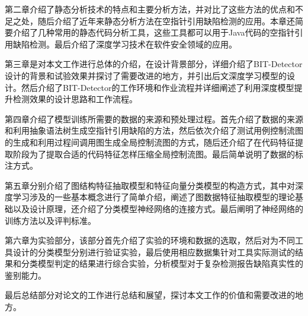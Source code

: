 第二章介绍了静态分析技术的特点和主要分析方法，并对比了这些方法的优点和不足之处，随后介绍了近年来静态分析方法在空指针引用缺陷检测的应用。本章还简要介绍了几种常用的静态代码分析工具，这些工具都可以用于Java代码的空指针引用缺陷检测。最后介绍了深度学习技术在软件安全领域的应用。

第三章是对本文工作进行总体的介绍，在设计背景部分，详细介绍了BIT-Detector设计的背景和试验效果并探讨了需要改进的地方，并引出后文深度学习模型的设计。然后介绍了BIT-Detector的工作环境和作业流程并详细阐述了利用深度模型提升检测效果的设计思路和工作流程。

第四章介绍了模型训练所需要的数据的来源和预处理过程。首先介绍了数据的来源和利用抽象语法树生成空指针引用缺陷的方法，然后依次介绍了测试用例控制流图的生成和利用过程间调用图生成全局控制流图的方式，随后还介绍了在代码特征提取阶段为了提取合适的代码特征怎样压缩全局控制流图。最后简单说明了数据的标注方式。

第五章分别介绍了图结构特征抽取模型和特征向量分类模型的构造方式，其中对深度学习涉及的一些基本概念进行了简单介绍，阐述了图数据特征抽取模型的理论基础以及设计原理，还介绍了分类模型神经网络的连接方式。最后阐明了神经网络的训练方法以及评判标准。 

第六章为实验部分，该部分首先介绍了实验的环境和数据的选取，然后对为不同工具设计的分类模型分别进行验证实验，最后使用相应数据集针对工具实际测试的结果和分类模型判定的结果进行综合实验，分析模型对于复杂检测报告缺陷真实性的鉴别能力。

最后总结部分对论文的工作进行总结和展望，探讨本文工作的价值和需要改进的地方。





